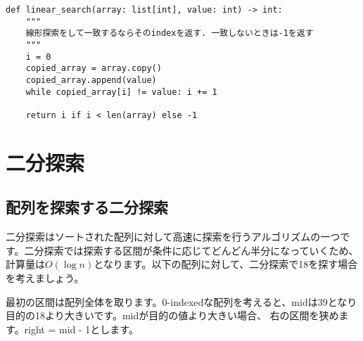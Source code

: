 \vspace{0.5cm}

\begin{center}
\end{center}

\begin{lstlisting}[caption=番兵の実装, frame=TRBL, label={sentinel}]
def linear_search(array: list[int], value: int) -> int:
    """
    線形探索をして一致するならそのindexを返す. 一致しないときは-1を返す
    """
    i = 0
    copied_array = array.copy()
    copied_array.append(value)
    while copied_array[i] != value: i += 1
    
    return i if i < len(array) else -1
  \end{lstlisting}

\section{二分探索}

\subsection{配列を探索する二分探索}

二分探索はソートされた配列に対して高速に探索を行うアルゴリズムの一つです。二分探索では探索する区間が条件に応じてどんどん半分になっていくため、
計算量は$O(\log n)$となります。以下の配列に対して、二分探索で18を探す場合を考えましょう。

最初の区間は配列全体を取ります。0-indexedな配列を考えると、midは39となり目的の18より大きいです。midが目的の値より大きい場合、
右の区間を狭めます。right = mid - 1とします。

